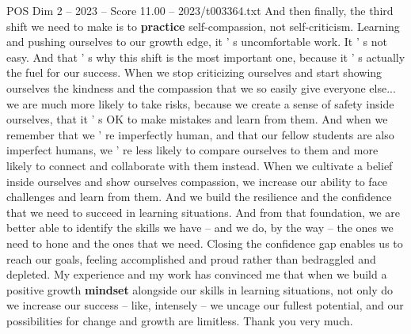 \begin{textsample}{POS Dim 2 – 2023 – Score 11.00 – 2023/t003364.txt}
And then finally, the third shift we need to make is to \textbf{practice} self-compassion, not self-criticism.
Learning and pushing ourselves to our growth edge, it ' s uncomfortable work.
It ' s not easy.
And that ' s why this shift is the most important one, because it ' s actually the fuel for our success.
When we stop criticizing ourselves and start showing ourselves the kindness and the compassion that we so easily give everyone else... we are much more likely to take risks, because we create a sense of safety inside ourselves, that it ' s OK to make mistakes and learn from them.
And when we remember that we ' re imperfectly human, and that our fellow students are also imperfect humans, we ' re less likely to compare ourselves to them and more likely to connect and collaborate with them instead.
When we cultivate a belief inside ourselves and show ourselves compassion, we increase our ability to face challenges and learn from them.
And we build the resilience and the confidence that we need to succeed in learning situations.
And from that foundation, we are better able to identify the skills we have -- and we do, by the way -- the ones we need to hone and the ones that we need.
Closing the confidence gap enables us to reach our goals, feeling accomplished and proud rather than bedraggled and depleted.
My experience and my work has convinced me that when we build a positive growth \textbf{mindset} alongside our skills in learning situations, not only do we increase our success -- like, intensely -- we uncage our fullest potential, and our possibilities for change and growth are limitless.
Thank you very much.

\end{textsample}
